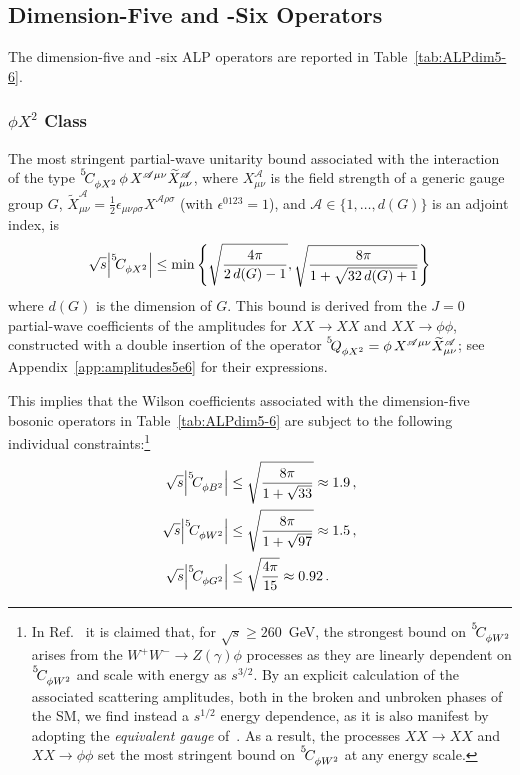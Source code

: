 \subsection{Dimension-Five and -Six Operators}

The dimension-five and -six ALP operators are reported in Table~\ref{tab:ALPdim5-6}.

\subsubsection{$\phi X^2$ Class\label{par:phiX2}}

The most stringent partial-wave unitarity bound associated with the interaction of the type $\coef{5}{\phi X^2}{}\,\phi\, X^{\mathscr A\mu\nu}\widetilde X_{\mu\nu}^{\mathscr A}$, where $X_{\mu\nu}^{\mathscr A}$ is the field strength of a generic gauge group $G$, $\widetilde X_{\mu\nu}^{\mathscr A} = \frac{1}{2}\epsilon_{\mu\nu\rho\sigma}X^{\mathscr A \rho\sigma}$ (with $\epsilon^{0123} = 1$), and $\mathscr A\in\{1,\dotsc,d(G)\}$ is an adjoint index, is
%
\begin{equation}\label{eq:phiX2_unibounds}
    \sqrt{s}\abs{\coef{5}{\phi X^2}{}} \le \min\left\{ \sqrt{\frac{4\pi}{2\,d(G)-1}},\sqrt{\frac{8\pi}{1+\sqrt{32\,d(G)+1}}}\right\}
\end{equation}
%
where $d(G)$ is the dimension of $G$.
This bound is derived from the $J=0$ partial-wave coefficients of the amplitudes for $XX \to XX$ and $XX \to \phi \phi$, constructed with a double insertion of the operator $\op{5}{\phi X^2}{} = \phi\, X^{\mathscr A\mu\nu}\widetilde X_{\mu\nu}^{\mathscr A}$; see Appendix~\ref{app:amplitudes5e6} for their expressions.

This implies that the Wilson coefficients associated with the dimension-five bosonic operators in Table~\ref{tab:ALPdim5-6} are subject to the following individual constraints:\footnote{In Ref.~\cite{Brivio:2021fog} it is claimed that, for $\sqrt{s} \geq 260$~GeV, the strongest bound on $\coef{5}{\phi W^2}{}$ arises from the $W^+ W^- \to Z (\gamma) \phi$ processes as they are linearly dependent on $\coef{5}{\phi W^2}{}$ and scale with energy as $s^{3/2}$. By an explicit calculation of the associated scattering amplitudes, both in the broken and unbroken phases of the SM, we find instead a $s^{1/2}$ energy dependence, as it is also manifest by adopting the \textit{equivalent gauge} of~\cite{Wulzer:2013mza}. As a result, the processes $XX \to XX$ and $XX \to \phi \phi$ set the most stringent bound on $\coef{5}{\phi W^2}{}$ at any energy scale.}
%
\begin{align}
    \sqrt{s}\abs{\coef{5}{\phi B^2}{}} &\le \sqrt{\frac{8\pi}{1+\sqrt{33}}} \approx 1.9\,,
    \\
    \sqrt{s}\abs{\coef{5}{\phi W^2}{}} &\le \sqrt{\frac{8\pi}{1+\sqrt{97}}}\approx 1.5\,,
    \\
    \sqrt{s}\abs{\coef{5}{\phi G^2}{}} &\le \sqrt{\frac{4\pi}{15}} \approx 0.92\,.
\end{align}

